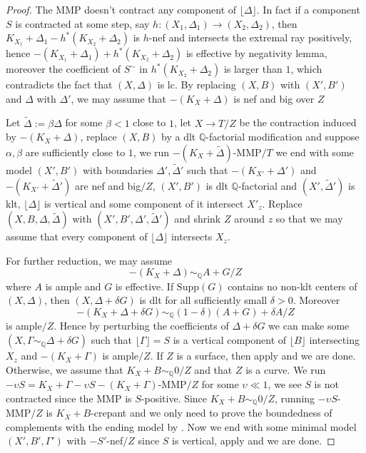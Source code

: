 \documentclass[letterpaper,reqno,12pt]{amsart}
\numberwithin{equation}{section}
\theoremstyle{plain}
\begin{document}
\begin{proof}
    The MMP doesn't contract any component of $\lfloor \Delta\rfloor$. In fact if a component $S$ is contracted at some step, say $h:(X_1,\Delta_1)\to (X_2,\Delta_2)$, then $K_{X_1}+\Delta_1-h^*(K_{X_2}+\Delta_2)$ is $h$-nef and intersects the extremal ray positively, hence $-(K_{X_1}+\Delta_1)+h^*(K_{X_2}+\Delta_2)$ is effective by negativity lemma, moreover the coefficient of $S^\sim$ in $h^*(K_{X_2}+\Delta_2)$ is larger than $1$, which contradicts the fact that $(X,\Delta)$ is lc. By replacing $(X,B)$ with $(X',B')$ and $\Delta$ with $\Delta'$, we may assume that $-(K_X+\Delta)$ is nef and big over $Z$ 
    
    Let $\tilde\Delta:=\beta\Delta$ for some $\beta<1$ close to $1$, let $X\to T/Z$ be the contraction induced by $-(K_X+\Delta)$, replace $(X,B)$ by a dlt ${\mathbb Q}$-factorial modification and suppose $\alpha,\beta$ are sufficiently close to $1$, we run $-(K_X+\tilde\Delta)$-MMP$/T$ we end with some model $(X',B')$ with boundaries $\Delta',\tilde\Delta'$ such that $-(K_{X'}+\Delta')$ and $-(K_{X'}+\tilde\Delta')$ are nef and big$/Z$, $(X',B')$ is dlt ${\mathbb Q}$-factorial and $(X',\tilde\Delta')$ is klt, $\lfloor \Delta\rfloor$ is vertical and some component of it intersect $X'_z$. Replace $(X,B,\Delta,\tilde \Delta)$ with $(X',B',\Delta',\tilde \Delta')$ and shrink $Z$ around $z$ so that we may assume that every component of $\lfloor \Delta\rfloor$ intersects $X_z$.

    For further reduction, we may assume \[-(K_X+\Delta)\sim_{\mathbb Q}A+G/Z\] where $A$ is ample and $G$ is effective. If $\text{Supp}(G)$ contains no non-klt centers of $(X,\Delta)$, then $(X,\Delta+\delta G)$ is dlt for all sufficiently small $\delta>0$. Moreover \[-(K_X+\Delta+\delta G)\sim_{\mathbb Q}(1-\delta)(A+G)+\delta A/Z\] is ample$/Z$. Hence by perturbing the coefficients of $\Delta+\delta G$ we can make some $(X,\Gamma\sim_{\mathbb Q}\Delta+\delta G)$ such that $\lfloor\Gamma\rfloor=S$ is a vertical component of $\lfloor B\rfloor$ intersecting $X_z$ and $-(K_X+\Gamma)$ is ample$/Z$. If $Z$ is a surface, then apply  and we are done. Otherwise, we assume that $K_X+B\sim_\mathbb Q0/Z$ and that $Z$ is a curve. We run $-\upsilon S=K_X+\Gamma-\upsilon S-(K_X+\Gamma)$-MMP$/Z$ for some $\upsilon\ll 1$, we see $S$ is not contracted since the MMP is $S$-positive. Since $K_X+B\sim_{\mathbb Q}0/Z$, running $-\upsilon S$-MMP$/Z$ is $K_X+B$-crepant and  we only need to prove the boundedness of complements with the ending model by . Now we end with some minimal model $(X',B',\Gamma')$ with $-S'$-nef$/Z$ since $S$ is vertical, apply  and we are done.
    

\end{proof}
\end{document}
